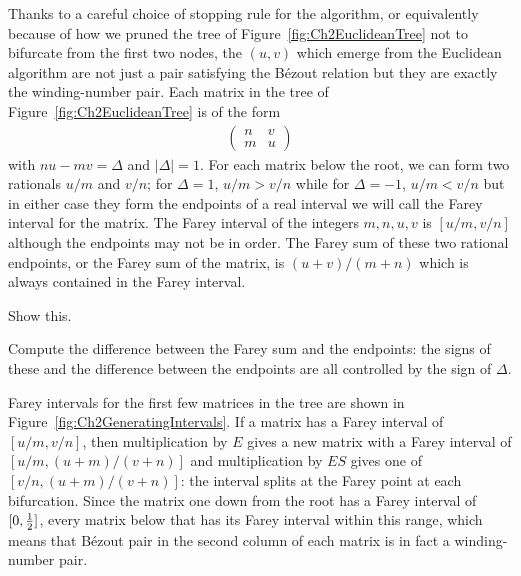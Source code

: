 Thanks to a careful choice of stopping rule for the algorithm, or equivalently because of how we pruned the tree of Figure~\ref{fig:Ch2EuclideanTree} not to bifurcate from the first two nodes, the $(u,v)$ which emerge from the Euclidean algorithm are not just a pair satisfying the B\'ezout relation but they are exactly the winding-number pair.
%
Each matrix in the tree of Figure~\ref{fig:Ch2EuclideanTree} is of the form
\begin{align*}
	\begin{pmatrix} 
		n & v
		\\
		m & u
	\end{pmatrix}
\end{align*}
with $nu-mv=\Delta$ and $|\Delta|=1$. For each matrix below the root, we can form two rationals $u/m$ and $v/n$; for  $\Delta=1$, $u/m>v/n$ while for $\Delta=-1$, $u/m<v/n$ but in either case they form the endpoints of a real interval we will call the Farey interval for the matrix. 
The Farey interval of the integers $m, n, u, v$ is $[u/m,v/n]$ although the endpoints may not be in order. 
The Farey sum of these two rational endpoints, or the Farey sum of the matrix, is $(u+v)/(m+n)$ which is always contained in the Farey interval.
\begin{jExercise}
	Show this.
\end{jExercise}
\begin{jAnswer}
	Compute the difference between the Farey sum and the endpoints: the signs of these and the difference between the endpoints are all controlled by the sign of $\Delta$. 
\end{jAnswer}

Farey intervals for the first few matrices in the tree are shown in Figure~\ref{fig:Ch2GeneratingIntervals}.
%
If a matrix has a Farey interval of  $[u/m,v/n]$, then multiplication by $E$ gives a new matrix with a Farey interval of $[u/m,(u+m)/(v+n)]$ and multiplication by $ES$ gives one of  $[v/n,(u+m)/(v+n)]$: the interval splits at the Farey point at each bifurcation. Since the matrix one down from the root has a Farey interval of $[0,\textstyle{\frac{1}{2}}]$, every matrix below that has its Farey interval within this range, which means that  B\'ezout pair in the second column of each matrix is in fact a winding-number pair.

